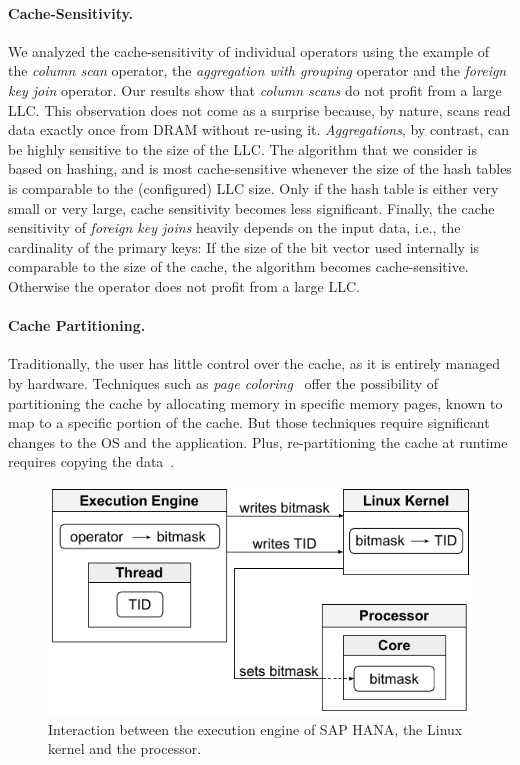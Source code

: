 \documentclass[11pt,dvipdfm]{article}
\begin{document}
\paragraph*{Cache-Sensitivity.}
We analyzed the cache-sensitivity of individual operators using the example of the \emph{column scan} operator, the \emph{aggregation with grouping} operator and the \emph{foreign key join} operator. 
Our results show that \emph{column scans} do not profit from a large LLC.
This observation does not come as a surprise because, by nature, scans read data exactly once from DRAM without re-using it.
\emph{Aggregations}, by contrast, can be highly sensitive to the size of the LLC.
The algorithm that we consider is based on hashing, and is most cache-sensitive whenever the size of the hash tables is comparable to the (configured) LLC size.
Only if the hash table is either very small or very large, cache sensitivity becomes less significant.
Finally, the cache sensitivity of \emph{foreign key joins} heavily depends on the input data, i.e., the cardinality of the primary keys:
If the size of the bit vector used internally is comparable to the size of the cache, the algorithm becomes cache-sensitive.
Otherwise the operator does not profit from a large LLC.

\paragraph*{Cache Partitioning.}
Traditionally, the user has little control over the cache, as it is entirely managed by hardware.
Techniques such as \emph{page coloring}~\cite{nollhrm19:Lee:2009:MMC:1687627.1687670} offer the possibility of partitioning the cache by allocating memory in specific memory pages, known to map to a specific portion of the cache.
But those techniques require significant changes to the OS and the application.
Plus, re-partitioning the cache at runtime requires copying the data~\cite{nollhrm19:4658653, nollhrm19:Zhang:2009:TPP:1519065.1519076}.

\begin{figure}
\centering
\includegraphics[bb=0 0 260 140]{figs/figure3.pdf}
\caption{Interaction between the execution engine of SAP HANA, the Linux kernel and the processor.}
\label{nollhrm19:fig:hana_cat}
\end{figure}
\end{document}
